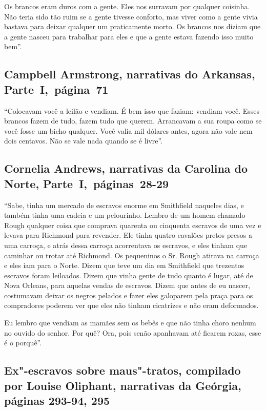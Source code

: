 Os brancos eram duros com a gente. Eles nos surravam por qualquer
coisinha. Não teria sido tão ruim se a gente tivesse conforto, mas viver
como a gente vivia bastava para deixar qualquer um praticamente morto. Os
brancos nos diziam que a gente nasceu para trabalhar para eles e que a
gente estava fazendo isso muito bem''.

\subsection{Campbell Armstrong, narrativas do Arkansas, Parte~I,~página~71} \label{ref11}

``Colocavam você a leilão e vendiam. É bem isso que faziam: vendiam
você. Esses brancos fazem de tudo, fazem tudo que querem. Arrancavam a
sua roupa como se você fosse um bicho qualquer. Você valia mil dólares
antes, agora não vale nem dois centavos. Não se vale nada quando se é
livre''.

\subsection{Cornelia Andrews, narrativas da Carolina do Norte, Parte~I,~páginas~28-29} \label{ref08}

``Sabe, tinha um mercado de escravos enorme em Smithfield naqueles dias,
e também tinha uma cadeia e um pelourinho. Lembro de um homem chamado
Rough qualquer coisa que comprava quarenta ou cinquenta escravos de uma
vez e levava para Richmond para revender. Ele tinha quatro cavalões
pretos presos a uma carroça, e atrás dessa carroça acorrentava os
escravos, e eles tinham que caminhar ou trotar até Richmond. Os
pequeninos o Sr. Rough atirava na carroça e eles iam para o Norte. Dizem
que teve um dia em Smithfield que trezentos escravos foram leiloados.
Dizem que vinha gente de tudo quanto é lugar, até de Nova Orleans, para
aquelas vendas de escravos. Dizem que antes de eu nascer, costumavam
deixar os negros pelados e fazer eles galoparem pela praça para os
compradores poderem ver que eles não tinham cicatrizes e não eram
deformados.

Eu lembro que vendiam as mamães sem os bebês e que não tinha choro
nenhum no ouvido do senhor. Por quê? Ora, pois senão apanhavam até
ficarem roxas, esse é o porquê''.

\subsection{Ex"-escravos sobre maus"-tratos, compilado por Louise Oliphant, narrativas
da Geórgia, páginas 293-94, 295}

